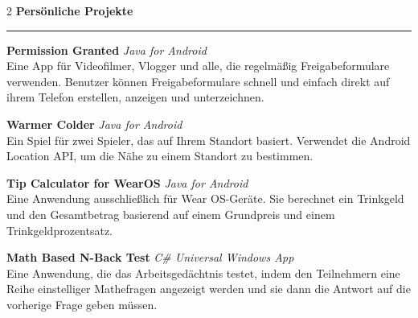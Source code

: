 \documentclass[a4paper,10pt]{article}
\newcommand{\sect}[1]{\vspace{9pt}\textbf{\large #1}\vspace{-10pt}\par\textcolor{maincolor}{\rule{\linewidth}{0.8pt}}\vspace{4pt}}
\begin{document}
\begin{paracol}{2}
\sect{Persönliche Projekte}
\textbf{Permission Granted} \hfill \textit{Java for Android}\\	
Eine App für Videofilmer, Vlogger und alle, die regelmäßig Freigabeformulare verwenden. Benutzer können Freigabeformulare schnell und einfach direkt auf ihrem Telefon erstellen, anzeigen und unterzeichnen.\par
\textbf{Warmer Colder} \hfill \textit{Java for Android}\\	
Ein Spiel für zwei Spieler, das auf Ihrem Standort basiert. Verwendet die Android Location API, um die Nähe zu einem Standort zu bestimmen.\par
\textbf{Tip Calculator for WearOS} \hfill \textit{Java for Android}\\
Eine Anwendung ausschließlich für Wear OS-Geräte. Sie berechnet ein Trinkgeld und den Gesamtbetrag basierend auf einem Grundpreis und einem Trinkgeldprozentsatz.\par
\textbf{Math Based N-Back Test} \hfill \textit{C\# Universal Windows App}\\
Eine Anwendung, die das Arbeitsgedächtnis testet, indem den Teilnehmern eine Reihe einstelliger Mathefragen angezeigt werden und sie dann die Antwort auf die vorherige Frage geben müssen.


\end{paracol}
\end{document}
